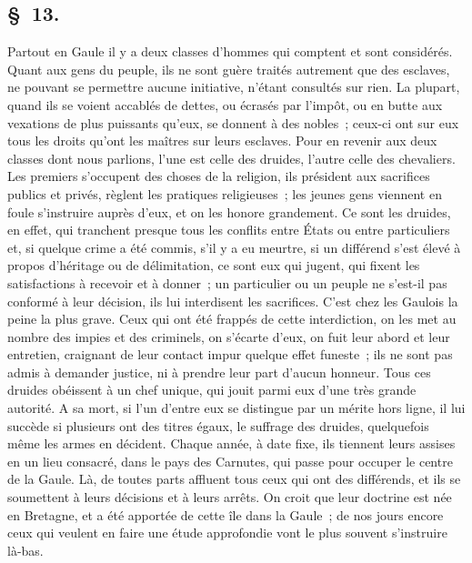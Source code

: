 \documentclass[french,twoside]{book} %
\begin{document}
\subsection[{§ 13.}]{ \textsc{§ 13.} }
\noindent Partout en Gaule il y a deux classes d’hommes qui comptent et sont considérés. Quant aux gens du peuple, ils ne sont guère traités autrement que des esclaves, ne pouvant se permettre aucune initiative, n’étant consultés sur rien. La plupart, quand ils se voient accablés de dettes, ou écrasés par l’impôt, ou en butte aux vexations de plus puissants qu’eux, se donnent à des nobles ; ceux-ci ont sur eux tous les droits qu’ont les maîtres sur leurs esclaves. Pour en revenir aux deux classes dont nous parlions, l’une est celle des druides, l’autre celle des chevaliers. Les premiers s’occupent des choses de la religion, ils président aux sacrifices publics et privés, règlent les pratiques religieuses ; les jeunes gens viennent en foule s’instruire auprès d’eux, et on les honore grandement. Ce sont les druides, en effet, qui tranchent presque tous les conflits entre États ou entre particuliers et, si quelque crime a été commis, s’il y a eu meurtre, si un différend s’est élevé à propos d’héritage ou de délimitation, ce sont eux qui jugent, qui fixent les satisfactions à recevoir et à donner ; un particulier ou un peuple ne s’est-il pas conformé à leur décision, ils lui interdisent les sacrifices. C'est chez les Gaulois la peine la plus grave. Ceux qui ont été frappés de cette interdiction, on les met au nombre des impies et des criminels, on s’écarte d’eux, on fuit leur abord et leur entretien, craignant de leur contact impur quelque effet funeste ; ils ne sont pas admis à demander justice, ni à prendre leur part d’aucun honneur. Tous ces druides obéissent à un chef unique, qui jouit parmi eux d’une très grande autorité. A sa mort, si l’un d’entre eux se distingue par un mérite hors ligne, il lui succède si plusieurs ont des titres égaux, le suffrage des druides, quelquefois même les armes en décident. Chaque année, à date fixe, ils tiennent leurs assises en un lieu consacré, dans le pays des Carnutes, qui passe pour occuper le centre de la Gaule. Là, de toutes parts affluent tous ceux qui ont des différends, et ils se soumettent à leurs décisions et à leurs arrêts. On croit que leur doctrine est née en Bretagne, et a été apportée de cette île dans la Gaule ; de nos jours encore ceux qui veulent en faire une étude approfondie vont le plus souvent s’instruire là-bas.
\end{document}
